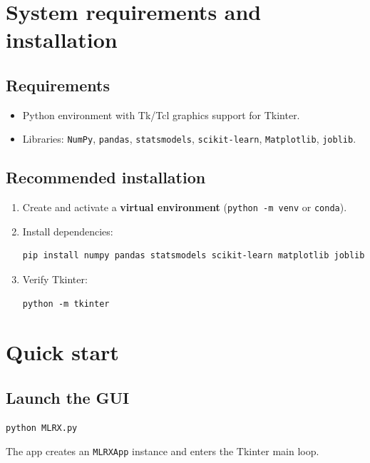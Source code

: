 \documentclass[12pt,a4paper]{article}
\begin{document}
\section{System requirements and installation}
\subsection{Requirements}
\begin{itemize}
  \item Python environment with Tk/Tcl graphics support for Tkinter.
  \item Libraries: \texttt{NumPy}, \texttt{pandas}, \texttt{statsmodels}, \texttt{scikit-learn}, \texttt{Matplotlib}, \texttt{joblib}.
\end{itemize}

\subsection{Recommended installation}
\begin{enumerate}
  \item Create and activate a \textbf{virtual environment} (\texttt{python -m venv} or \texttt{conda}).
  \item Install dependencies:
\begin{lstlisting}[style=mlrx]
pip install numpy pandas statsmodels scikit-learn matplotlib joblib
\end{lstlisting}
  \item Verify Tkinter:
\begin{lstlisting}[style=mlrx]
python -m tkinter
\end{lstlisting}
\end{enumerate}

\section{Quick start}
\subsection{Launch the GUI}
\begin{lstlisting}[style=mlrx]
python MLRX.py
\end{lstlisting}
The app creates an \texttt{MLRXApp} instance and enters the Tkinter main loop.

\end{document}
